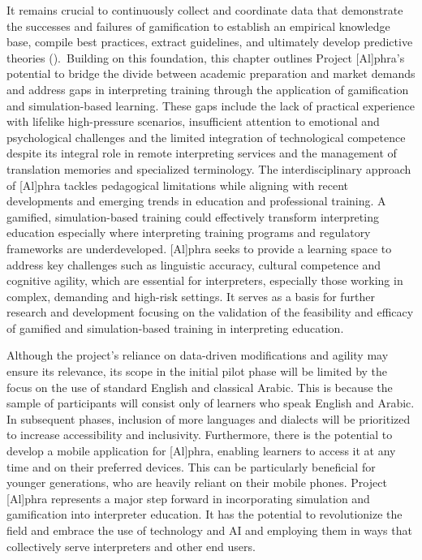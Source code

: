 \documentclass[output=paper]{langscibook}
\begin{document}
It remains crucial to continuously collect and coordinate data that demonstrate the successes and failures of gamification to establish an empirical knowledge base, compile best practices, extract guidelines, and ultimately develop predictive theories (\citealt{dichev2017gamifying}).~Building on this foundation, this chapter outlines Project [Al]phra’s potential to bridge the divide between academic preparation and market demands and address gaps in interpreting training through the application of gamification and simulation-based learning. These gaps include the lack of practical experience with lifelike high-pressure scenarios, insufficient attention to emotional and psychological challenges and the limited integration of technological competence despite its integral role in remote interpreting services and the management of translation memories and specialized terminology. The interdisciplinary approach of [Al]phra tackles pedagogical limitations while aligning with recent developments and emerging trends in education and professional training. A gamified, simulation-based training could effectively transform interpreting education especially where interpreting training programs and regulatory frameworks are underdeveloped. [Al]phra seeks to provide a learning space to address key challenges such as linguistic accuracy, cultural competence and cognitive agility, which are essential for interpreters, especially those working in complex, demanding and high-risk settings. It serves as a basis for further research and development focusing on the validation of the feasibility and efficacy of gamified and simulation-based training in interpreting education. 

Although the project’s reliance on data-driven modifications and agility may ensure its relevance, its scope in the initial pilot phase will be limited by the focus on the use of standard English and classical Arabic. This is because the sample of participants will consist only of learners who speak English and Arabic. In subsequent phases, inclusion of more languages and dialects will be prioritized to increase accessibility and inclusivity. Furthermore, there is the potential to develop a mobile application for [Al]phra, enabling learners to access it at any time and on their preferred devices. This can be particularly beneficial for younger generations, who are heavily reliant on their mobile phones. Project [Al]phra represents a major step forward in incorporating simulation and gamification into interpreter education. It has the potential to revolutionize the field and embrace the use of technology and AI and employing them in ways that collectively serve interpreters and other end users. 

\sloppy\printbibliography[heading=subbibliography,notkeyword=this]
\end{document}
